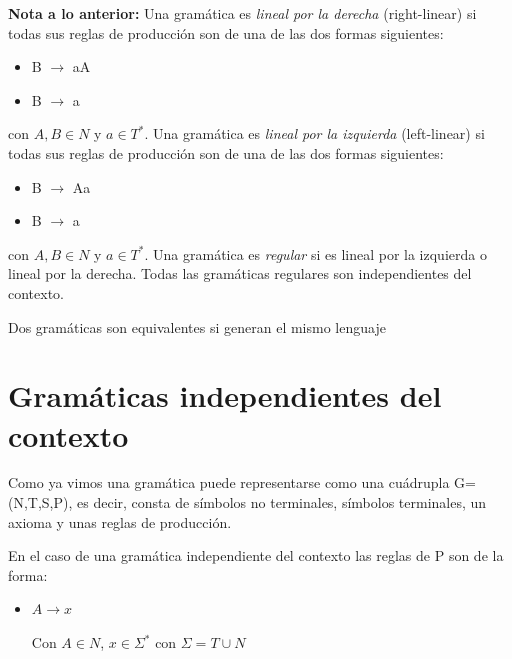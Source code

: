 \documentclass{apuntes}
\begin{document}
\newpage
{\bf Nota a lo anterior:} Una gramática es {\em lineal por la derecha} (right-linear) si todas sus reglas de producción son de una de las dos formas siguientes:

\begin{itemize}
\item B $\rightarrow$ aA
\item B $\rightarrow$ a
\end{itemize}

\noindent con $A, B \in N$ y $a \in T^{*}$. Una gramática es {\em lineal por la izquierda} (left-linear) si todas sus reglas de producción son de una de las dos formas siguientes:

\begin{itemize}
\item B $\rightarrow$ Aa
\item B $\rightarrow$ a
\end{itemize}

\noindent con $A, B \in N$ y $a \in T^{*}$. Una gramática es {\em regular} si es lineal por la izquierda o lineal por la derecha. Todas las gramáticas regulares son independientes del contexto.

\begin{defn}
Dos gramáticas son equivalentes si generan el mismo lenguaje
\end{defn}

\section{Gramáticas independientes del contexto}
Como ya vimos una gramática puede representarse como una cuádrupla G=(N,T,S,P), es decir, consta de símbolos no terminales, símbolos terminales, un axioma y unas reglas de producción.

En el caso de una gramática independiente del contexto las reglas de P son de la forma:
\begin{itemize}
\item $A \rightarrow x$

Con $A\in N$, $x \in \Sigma^*$ con $\Sigma=T\cup N$
\end{itemize}
\end{document}
